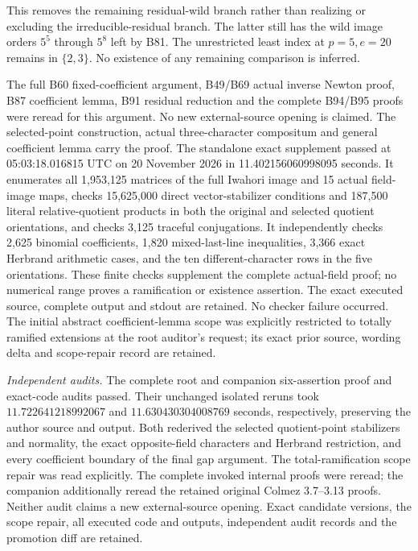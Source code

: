 \begin{remark}
\label{rem:B-RD96-scope}
This removes the remaining residual-wild branch rather
than realizing or excluding the irreducible-residual branch.
The latter still has the wild image orders $5^5$ through $5^8$
left by B81. The unrestricted least index at $p=5,e=20$ remains
in $\{2,3\}$. No existence of any remaining comparison is inferred.

The full B60 fixed-coefficient argument, B49/B69 actual inverse
Newton proof, B87 coefficient lemma, B91 residual reduction and
the complete B94/B95 proofs were reread for this argument.
No new external-source opening is claimed. The selected-point
construction, actual three-character compositum and general
coefficient lemma carry the proof. The standalone exact supplement
passed at 05:03:18.016815 UTC on 20 November 2026 in
11.402156060998095 seconds. It enumerates all 1,953,125 matrices
of the full Iwahori image and 15 actual field-image maps, checks
15,625,000 direct vector-stabilizer conditions and 187,500 literal
relative-quotient products in both the original and selected quotient
orientations, and checks 3,125 traceful conjugations. It independently
checks 2,625 binomial coefficients, 1,820 mixed-last-line inequalities,
3,366 exact Herbrand arithmetic cases, and the ten different-character
rows in the five orientations. These finite checks supplement the
complete actual-field proof; no numerical range proves a ramification
or existence assertion. The exact executed source, complete output
and stdout are retained. No checker failure occurred. The initial
abstract coefficient-lemma scope was explicitly restricted to totally
ramified extensions at the root auditor's request; its exact prior
source, wording delta and scope-repair record are retained.

\smallskip
\noindent\emph{Independent audits.}
The complete root and companion six-assertion proof and exact-code
audits passed. Their unchanged isolated reruns took
\(11.722641218992067\) and \(11.630430304008769\) seconds, respectively,
preserving the author source and output. Both rederived the selected
quotient-point stabilizers and normality, the exact opposite-field
characters and Herbrand restriction, and every coefficient boundary
of the final gap argument. The total-ramification scope repair was
read explicitly. The complete invoked internal proofs were reread;
the companion additionally reread the retained original Colmez
3.7--3.13 proofs. Neither audit claims a new external-source opening.
Exact candidate versions, the scope repair, all executed code and
outputs, independent audit records and the promotion diff are retained.
\end{remark}
